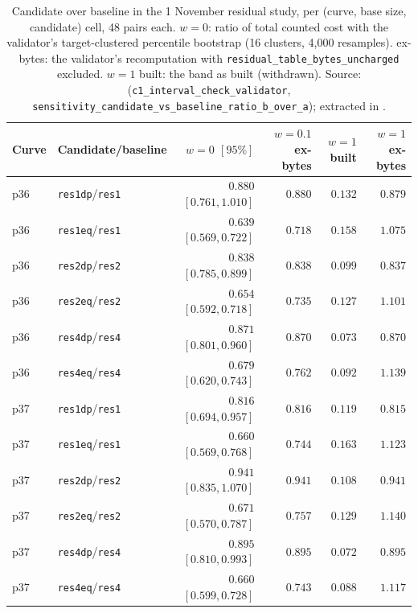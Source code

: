 \begin{table}[t]
\centering\small
\begin{tabular}{@{}llrrrr@{}}
\toprule
Curve & Candidate/baseline & $w=0$ $[95\%]$ & $w=0.1$ ex-bytes & $w=1$ built & $w=1$ ex-bytes \\
\midrule
p36 & \texttt{res1dp}/\texttt{res1} & $0.880$ $[0.761,1.010]$ & $0.880$ & $0.132$ & $0.879$ \\
p36 & \texttt{res1eq}/\texttt{res1} & $0.639$ $[0.569,0.722]$ & $0.718$ & $0.158$ & $1.075$ \\
p36 & \texttt{res2dp}/\texttt{res2} & $0.838$ $[0.785,0.899]$ & $0.838$ & $0.099$ & $0.837$ \\
p36 & \texttt{res2eq}/\texttt{res2} & $0.654$ $[0.592,0.718]$ & $0.735$ & $0.127$ & $1.101$ \\
p36 & \texttt{res4dp}/\texttt{res4} & $0.871$ $[0.801,0.960]$ & $0.870$ & $0.073$ & $0.870$ \\
p36 & \texttt{res4eq}/\texttt{res4} & $0.679$ $[0.620,0.743]$ & $0.762$ & $0.092$ & $1.139$ \\
p37 & \texttt{res1dp}/\texttt{res1} & $0.816$ $[0.694,0.957]$ & $0.816$ & $0.119$ & $0.815$ \\
p37 & \texttt{res1eq}/\texttt{res1} & $0.660$ $[0.569,0.768]$ & $0.744$ & $0.163$ & $1.123$ \\
p37 & \texttt{res2dp}/\texttt{res2} & $0.941$ $[0.835,1.070]$ & $0.941$ & $0.108$ & $0.941$ \\
p37 & \texttt{res2eq}/\texttt{res2} & $0.671$ $[0.570,0.787]$ & $0.757$ & $0.129$ & $1.140$ \\
p37 & \texttt{res4dp}/\texttt{res4} & $0.895$ $[0.810,0.993]$ & $0.895$ & $0.072$ & $0.895$ \\
p37 & \texttt{res4eq}/\texttt{res4} & $0.660$ $[0.599,0.728]$ & $0.743$ & $0.088$ & $1.117$ \\
\bottomrule
\end{tabular}
\caption[]{Candidate over baseline in the 1 November residual study, per
(curve, base size, candidate) cell, 48 pairs each. $w=0$: ratio of total
counted cost with the validator's target-clustered percentile bootstrap
(16 clusters, 4{,}000 resamples). ex-bytes: the validator's recomputation
with \texttt{residual\_table\_bytes\_uncharged} excluded. $w=1$ built:
the band as built (withdrawn). Source:
(\texttt{c1\_interval\_check\_validator},
\texttt{sensitivity\_candidate\_vs\_baseline\_ratio\_b\_over\_a});
extracted in .}
\label{tab:pf-residual-base}
\end{table}

